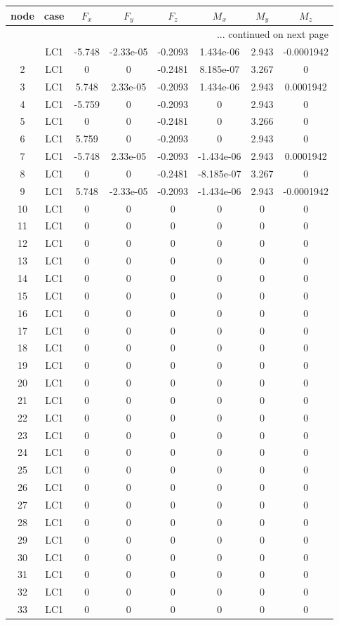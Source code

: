 \documentclass{article}%
\begin{document}
\begin{longtable}{| c c | c c c c c c |}%
\hline%
node&case&$F_x$&$F_y$&$F_z$&$M_x$&$M_y$&$M_z$\\%
\hline%
\endhead%
\hline%
\multicolumn{8}{r}{... continued on next page}\\%
\endfoot%
\hline%
\endlastfoot%
1&LC1&{-}5.748&{-}2.33e{-}05&{-}0.2093&1.434e{-}06&2.943&{-}0.0001942\\%
2&LC1&0&0&{-}0.2481&8.185e{-}07&3.267&0\\%
3&LC1&5.748&2.33e{-}05&{-}0.2093&1.434e{-}06&2.943&0.0001942\\%
4&LC1&{-}5.759&0&{-}0.2093&0&2.943&0\\%
5&LC1&0&0&{-}0.2481&0&3.266&0\\%
6&LC1&5.759&0&{-}0.2093&0&2.943&0\\%
7&LC1&{-}5.748&2.33e{-}05&{-}0.2093&{-}1.434e{-}06&2.943&0.0001942\\%
8&LC1&0&0&{-}0.2481&{-}8.185e{-}07&3.267&0\\%
9&LC1&5.748&{-}2.33e{-}05&{-}0.2093&{-}1.434e{-}06&2.943&{-}0.0001942\\%
10&LC1&0&0&0&0&0&0\\%
11&LC1&0&0&0&0&0&0\\%
12&LC1&0&0&0&0&0&0\\%
13&LC1&0&0&0&0&0&0\\%
14&LC1&0&0&0&0&0&0\\%
15&LC1&0&0&0&0&0&0\\%
16&LC1&0&0&0&0&0&0\\%
17&LC1&0&0&0&0&0&0\\%
18&LC1&0&0&0&0&0&0\\%
19&LC1&0&0&0&0&0&0\\%
20&LC1&0&0&0&0&0&0\\%
21&LC1&0&0&0&0&0&0\\%
22&LC1&0&0&0&0&0&0\\%
23&LC1&0&0&0&0&0&0\\%
24&LC1&0&0&0&0&0&0\\%
25&LC1&0&0&0&0&0&0\\%
26&LC1&0&0&0&0&0&0\\%
27&LC1&0&0&0&0&0&0\\%
28&LC1&0&0&0&0&0&0\\%
29&LC1&0&0&0&0&0&0\\%
30&LC1&0&0&0&0&0&0\\%
31&LC1&0&0&0&0&0&0\\%
32&LC1&0&0&0&0&0&0\\%
33&LC1&0&0&0&0&0&0\\%

\end{longtable}
\end{document}
